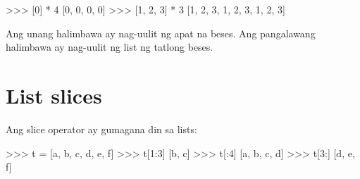 \documentclass[10pt,]{book}
\newenvironment{Shaded}{}{}
\newcommand{\DecValTok}[1]{\textcolor[rgb]{0.25,0.63,0.44}{#1}}
\newcommand{\NormalTok}[1]{#1}
\newcommand{\OperatorTok}[1]{\textcolor[rgb]{0.40,0.40,0.40}{#1}}
\newcommand{\StringTok}[1]{\textcolor[rgb]{0.25,0.44,0.63}{#1}}
\begin{document}
 

\begin{Shaded}
\begin{Highlighting}[]
\OperatorTok{\textgreater{}\textgreater{}\textgreater{}}\NormalTok{ [}\DecValTok{0}\NormalTok{] }\OperatorTok{*} \DecValTok{4}
\NormalTok{[}\DecValTok{0}\NormalTok{, }\DecValTok{0}\NormalTok{, }\DecValTok{0}\NormalTok{, }\DecValTok{0}\NormalTok{]}
\OperatorTok{\textgreater{}\textgreater{}\textgreater{}}\NormalTok{ [}\DecValTok{1}\NormalTok{, }\DecValTok{2}\NormalTok{, }\DecValTok{3}\NormalTok{] }\OperatorTok{*} \DecValTok{3}
\NormalTok{[}\DecValTok{1}\NormalTok{, }\DecValTok{2}\NormalTok{, }\DecValTok{3}\NormalTok{, }\DecValTok{1}\NormalTok{, }\DecValTok{2}\NormalTok{, }\DecValTok{3}\NormalTok{, }\DecValTok{1}\NormalTok{, }\DecValTok{2}\NormalTok{, }\DecValTok{3}\NormalTok{]}
\end{Highlighting}
\end{Shaded}

Ang unang halimbawa ay nag-uulit ng apat na beses. Ang pangalawang
halimbawa ay nag-uulit ng list ng tatlong beses.

\section{List slices}\label{list-slices}

  
 

Ang slice operator ay gumagana din sa lists:

\begin{Shaded}
\begin{Highlighting}[]
\OperatorTok{\textgreater{}\textgreater{}\textgreater{}}\NormalTok{ t }\OperatorTok{=}\NormalTok{ [}\StringTok{\textquotesingle{}a\textquotesingle{}}\NormalTok{, }\StringTok{\textquotesingle{}b\textquotesingle{}}\NormalTok{, }\StringTok{\textquotesingle{}c\textquotesingle{}}\NormalTok{, }\StringTok{\textquotesingle{}d\textquotesingle{}}\NormalTok{, }\StringTok{\textquotesingle{}e\textquotesingle{}}\NormalTok{, }\StringTok{\textquotesingle{}f\textquotesingle{}}\NormalTok{]}
\OperatorTok{\textgreater{}\textgreater{}\textgreater{}}\NormalTok{ t[}\DecValTok{1}\NormalTok{:}\DecValTok{3}\NormalTok{]}
\NormalTok{[}\StringTok{\textquotesingle{}b\textquotesingle{}}\NormalTok{, }\StringTok{\textquotesingle{}c\textquotesingle{}}\NormalTok{]}
\OperatorTok{\textgreater{}\textgreater{}\textgreater{}}\NormalTok{ t[:}\DecValTok{4}\NormalTok{]}
\NormalTok{[}\StringTok{\textquotesingle{}a\textquotesingle{}}\NormalTok{, }\StringTok{\textquotesingle{}b\textquotesingle{}}\NormalTok{, }\StringTok{\textquotesingle{}c\textquotesingle{}}\NormalTok{, }\StringTok{\textquotesingle{}d\textquotesingle{}}\NormalTok{]}
\OperatorTok{\textgreater{}\textgreater{}\textgreater{}}\NormalTok{ t[}\DecValTok{3}\NormalTok{:]}
\NormalTok{[}\StringTok{\textquotesingle{}d\textquotesingle{}}\NormalTok{, }\StringTok{\textquotesingle{}e\textquotesingle{}}\NormalTok{, }\StringTok{\textquotesingle{}f\textquotesingle{}}\NormalTok{]}
\end{Highlighting}
\end{Shaded}
\end{document}
